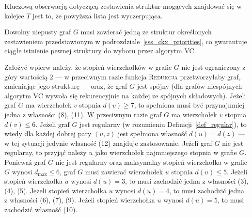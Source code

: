 {  Kluczową obserwacją dotyczącą zestawienia struktur mogących znajdować się w kolejce $T$ jest to, że powyższa lista jest wyczerpująca.
  \begin{theorem}
    Dowolny niepusty graf $G$ musi zawierać jedną ze struktur określonych zestawieniem przedstawionym w podrozdziale~\ref{sss_ckx_priorities}, co gwarantuje ciągłe istnienie pewnej struktury do wyboru przez algorytm \textsc{VC}.
  \end{theorem}
  \begin{bproof}
    Założyć wpierw należy, że stopień wierzchołków w grafie $G$ nie jest ograniczony z góry wartością 2 --- w przeciwnym razie funkcja \textsc{Redukcja} przetworzyłaby graf, zmieniając jego strukturę --- oraz, że graf $G$ jest spójny (dla grafów niespójnych algorytm \textsc{VC} wywoła się rekurencyjnie na każdej ze spójnych składowych).
    Jeżeli graf $G$ ma wierzchołek $v$ stopnia $d(v) \geq 7$, to spełniona musi być przynajmniej jedna z własności (8), (11).
    W przeciwnym razie graf $G$ ma wierzchołek $v$ stopnia $d(v) \leq 6$.
    Jeżeli graf $G$ jest regularny (w rozumieniu Definicji~\ref{def_regular}), to wtedy dla każdej dobrej pary $(u, z)$ jest spełniona własność $d(u)=d(z)$ --- w tej sytuacji jedynie własność (12) znajduje zastosowanie.
    Jeżeli graf $G$ nie jest regularny, to przyjąć należy $u$ jako wierzchołek najmniejszego stopnia w grafie $G$.
    Ponieważ graf $G$ nie jest regularny oraz maksymalny stopień wierzchołka w grafie $G$ wynosi $d_{\max} \leq 6$, graf $G$ musi zawierać wierzchołek $u$ stopnia $d(u) \leq 5$.
    Jeżeli stopień wierzchołka $u$ wynosi $d(u)=3$, to musi zachodzić jedna z własności (3), (4), (5).
    Jeżeli stopień wierzchołka $u$ wynosi $d(u)=4$, to musi zachodzić jedna z własności (6), (7), (9).
    Jeżeli stopień wierzchołka $u$ wynosi $d(u)=5$, to musi zachodzić własność (10).
  \end{bproof}
}
